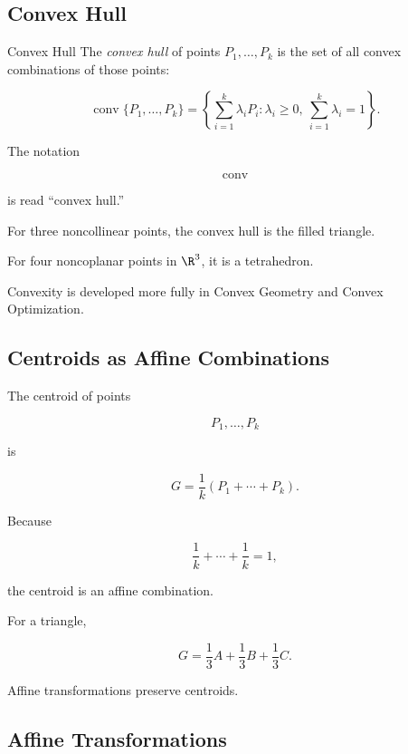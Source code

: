 \subsection{Convex Hull}
\label{subsec:convex-hull-affine}

\begin{definitionbox}{Convex Hull}
The \emph{convex hull} of points \(P_1,\ldots,P_k\) is the set of all convex
combinations of those points:

\[
\boxed{
\operatorname{conv}\{P_1,\ldots,P_k\}
=
\left\{
\sum_{i=1}^{k}\lambda_iP_i:
\lambda_i\geq0,\ 
\sum_{i=1}^{k}\lambda_i=1
\right\}.
}
\]
\end{definitionbox}

The notation

\[ \operatorname{conv} \]

is read ``convex hull.''

For three noncollinear points, the convex hull is the filled triangle.

For four noncoplanar points in \(\R^3\), it is a tetrahedron.

Convexity is developed more fully in Convex Geometry and Convex
Optimization.

\subsection{Centroids as Affine Combinations}
\label{subsec:centroids-affine}

The centroid of points

\[ P_1,\ldots,P_k \]

is

\[
\boxed{
G=\frac1k(P_1+\cdots+P_k).
}
\]

Because

\[ \frac1k+\cdots+\frac1k=1, \]

the centroid is an affine combination.

For a triangle,

\[ \boxed{G=\frac13A+\frac13B+\frac13C.} \]

Affine transformations preserve centroids.

\subsection{Affine Transformations}
\label{subsec:affine-transformations}


